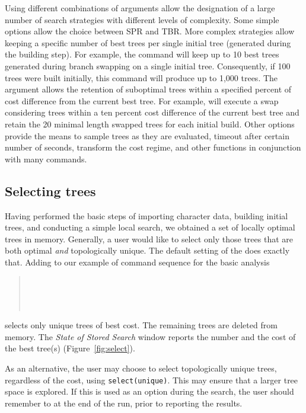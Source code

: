 {Using different combinations of  arguments
allow the designation of a  large number of search strategies with
different levels of complexity. Some simple options allow the choice
between SPR and TBR. More complex strategies allow keeping a specific
number of best trees per single initial tree (generated during the
building step).  For example, the command 
will keep up to 10 best trees generated during branch swapping on
a single initial tree. Consequently, if 100 trees were built
initially, this command will produce up to 1,000 trees. The argument
 allows the retention of suboptimal trees
within a specified percent of cost difference from the current best
tree. For example,  will
execute a swap considering trees within a ten percent cost difference
of the current best tree and retain the 20 minimal length swapped
trees for each initial build. Other options provide the means to
sample trees as they are evaluated, timeout after certain number
of seconds, transform the cost regime, and other functions in
conjunction with many \poy commands.

\subsection{Selecting trees}

Having performed the basic steps of importing character data,
building initial trees, and conducting a simple local search, we
obtained a set of locally optimal trees in memory. Generally, a user
would like to select only those trees that are both optimal \emph{and}
topologically unique. The default setting of the 
does exactly that.  Adding  to our example
of command sequence for the basic analysis

\begin{quote}
\\
\\
\\
\end{quote}

selects only unique trees of best cost. The remaining trees are
deleted from memory. The \emph{State of Stored Search} window reports
the number and the cost of the best tree(s) (Figure~\ref{fig:select}).

As an alternative, the user may choose to select topologically
unique trees, regardless of the cost, using \texttt{select(unique)}.
This may ensure that a larger tree space is explored.  If this is
used as an option during the search, the user should remember to
 at the end of the run, prior to reporting
the results.

}
